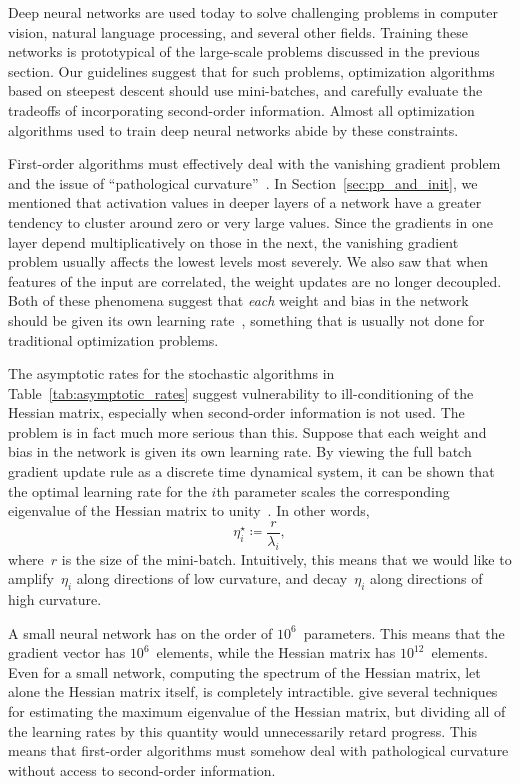 \documentclass[11pt,a4paper]{article}
\numberwithin{equation}{section}
\begin{document}
Deep neural networks are used today to solve challenging problems in computer
vision, natural language processing, and several other fields. Training these
networks is prototypical of the large-scale problems discussed in the previous
section. Our guidelines suggest that for such problems, optimization algorithms
based on steepest descent should use mini-batches, and carefully evaluate the
tradeoffs of incorporating second-order information. Almost all optimization
algorithms used to train deep neural networks abide by these constraints.

First-order algorithms must effectively deal with the vanishing gradient problem
and the issue of ``pathological curvature''~\citep{martens2010deep}. In
Section~\ref{sec:pp_and_init}, we mentioned that activation values in deeper
layers of a network have a greater tendency to cluster around zero or very large
values. Since the gradients in one layer depend multiplicatively on those in the
next, the vanishing gradient problem usually affects the lowest levels most
severely. We also saw that when features of the input are correlated, the weight
updates are no longer decoupled. Both of these phenomena suggest that
\emph{each} weight and bias in the network should be given its own learning
rate~\citep{lecun-98b}, something that is usually not done for traditional
optimization problems.

The asymptotic rates for the stochastic algorithms in
Table~\ref{tab:asymptotic_rates} suggest vulnerability to ill-conditioning of
the Hessian matrix, especially when second-order information is not used. The
problem is in fact much more serious than this. Suppose that each weight and
bias in the network is given its own learning rate. By viewing the full batch
gradient update rule as a discrete time dynamical system, it can be shown that
the optimal learning rate for the $i$th parameter scales the corresponding
eigenvalue of the Hessian matrix to unity~\citep{lecun-98b}. In other words,
\[
	\eta_i^\star \coloneqq \frac{r}{\lambda_i},
\]
where~$r$ is the size of the mini-batch. Intuitively, this means that we would
like to amplify~$\eta_i$ along directions of low curvature, and decay~$\eta_i$
along directions of high curvature.

A small neural network has on the order of $10^6$~parameters. This means that
the gradient vector has $10^6$~elements, while the Hessian matrix has
$10^{12}$~elements. Even for a small network, computing the spectrum of the
Hessian matrix, let alone the Hessian matrix itself, is completely intractible.
\citet{lecun-98b} give several techniques for estimating the maximum eigenvalue
of the Hessian matrix, but dividing all of the learning rates by this quantity
would unnecessarily retard progress. This means that first-order algorithms must
somehow deal with pathological curvature without access to second-order
information.
\end{document}
